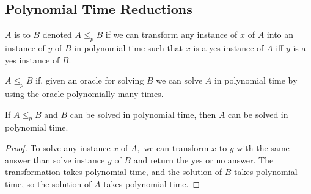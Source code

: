 \documentclass[a4paper,12pt]{article}
\begin{document}
\subsection{Polynomial Time Reductions}
\begin{definition}[(Karp)]
    $A$ is  to $B$ denoted $A\leq_pB$ if we can transform any instance of $x$ of $A$ into an instance of $y$ of $B$ in polynomial time such that $x$ is a yes instance of $A$ iff $y$ is a yes instance of $B.$
\end{definition}
\begin{definition}[(Cook)]
    $A\leq_pB$ if, given an oracle for solving $B$ we can solve $A$ in polynomial time by using the oracle polynomially many times.
\end{definition}
\begin{theorem}
    If $A\leq_pB$ and $B$ can be solved in polynomial time, then $A$ can be solved in polynomial time.\begin{proof}
        To solve any instance $x$ of $A,$ we can transform $x$ to $y$ with the same answer than solve instance $y$ of $B$ and return the yes or no answer. The transformation takes polynomial time, and the solution of $B$ takes polynomial time, so the solution of $A$ takes polynomial time.
    \end{proof}
\end{theorem}
\end{document}
